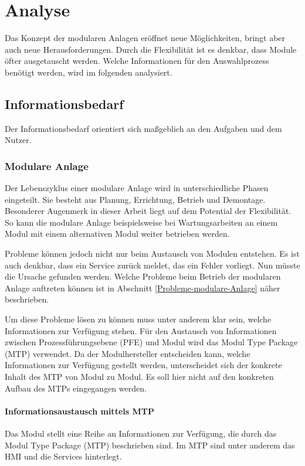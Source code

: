 
\chapter{Analyse}
\label{sec:Anforderungsanalyse}
Das Konzept der modularen Anlagen eröffnet neue Möglichkeiten, bringt aber auch neue Herausforderungen. Durch die Flexibilität ist es denkbar, dass Module öfter ausgetauscht werden. Welche Informationen für den Auswahlprozess benötigt werden, wird im folgenden analysiert.

\section{Informationsbedarf}
Der Informationsbedarf orientiert sich maßgeblich an den Aufgaben und dem Nutzer. 

\subsection{Modulare Anlage}
Der Lebenszyklus einer modulare Anlage wird in unterschiedliche Phasen eingeteilt. Sie besteht aus Planung, Errichtung, Betrieb und Demontage. \cite{Obst2013} Besonderer Augenmerk in dieser Arbeit liegt auf dem Potential der Flexibilität. So kann die modulare Anlage beispielsweise bei Wartungsarbeiten an einem Modul mit einem alternativen Modul weiter betrieben werden.

Probleme können jedoch nicht nur beim Austausch von Modulen entstehen. Es ist auch denkbar, dass ein Service zurück meldet, das ein Fehler vorliegt. Nun müsste die Ursache gefunden werden. Welche Probleme beim Betrieb der modularen Anlage auftreten können ist in Abschnitt \ref{Probleme-modulare-Anlage} näher beschrieben.

Um diese Probleme lösen zu können muss unter anderem klar sein, welche Informationen zur Verfügung stehen. Für den Austausch von Informationen zwischen Prozessführungsebene (PFE) und Modul wird das Modul Type Package (MTP) verwendet. Da der Modulhersteller entscheiden kann, welche Informationen zur Verfügung gestellt werden, unterscheidet sich der konkrete Inhalt des MTP von Modul zu Modul. Es soll hier nicht auf den konkreten Aufbau des MTPs eingegangen werden.

\subsubsection{Informationsaustausch mittels MTP}
Das Modul stellt eine Reihe an Informationen zur Verfügung, die durch das Modul Type Package (MTP) beschrieben sind. Im MTP sind unter anderem das HMI und die Services hinterlegt. 

